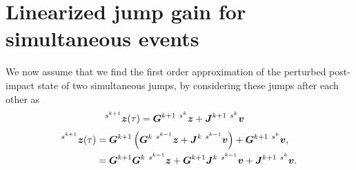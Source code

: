 \documentclass[../DC2017114Bouma.tex]{subfiles}
\begin{document}
\section{Linearized jump gain for simultaneous events}\label{app:multjumps}
We now assume that we find the first order approximation of the perturbed post-impact state of two simultaneous jumps, by considering these jumps after each other as
\begin{align}
\ls^{s^{k+1}}\zb(\tau) &= \Gb^{k+1}\ \ls^{s^{k}}\zb + \Jb^{k+1}\ \ls^{s^{k}}\vb
\end{align}
\begin{align}
\ls^{s^{k+1}}\zb(\tau) &= \Gb^{k+1}\left(\Gb^k\ \ls^{s^{k-1}}\zb + \Jb^k\ \ls^{s^{k-1}}\vb\right) + \Gb^{k+1}\ \ls^{s^{k}}\vb,\\
&= \Gb^{k+1}\Gb^k\ \ls^{s^{k-1}}\zb + \Gb^{k+1}\Jb^k\ \ls^{s^{k-1}}\vb + \Jb^{k+1}\ \ls^{s^{k}}\vb.\label{eq:zkplus}
\end{align}
\end{document}
